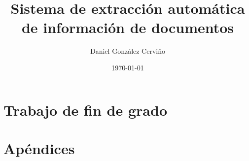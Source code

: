 \documentclass[11pt,a4paper]{report}
\title{Sistema de extracción automática de información de documentos}
\author{Daniel González Cerviño}
\date{\today}
\begin{document}
    
    

    \tableofcontents
    \listoffigures
    

    



    \part{Trabajo de fin de grado}\label{part:tfg}
    
    
    
    
    
    



    \part{Apéndices}\label{part:appendix}
    \appendix
    
    

    
    
\end{document}
